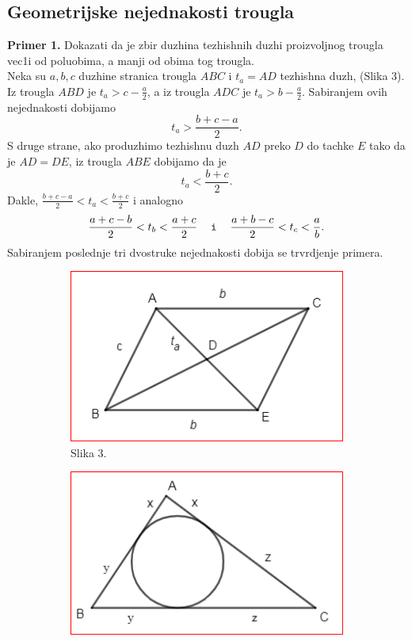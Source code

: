\documentclass[11pt]{article}
\newcommand{\D}{\displaystyle}
\begin{document}
\begin{large}
\begin{flushleft}
\vspace*{-1.3in}
\section*{\centering \huge \textbf{Geometrijske nejednakosti trougla}}
\textbf{Primer 1.} Dokazati da je zbir duzhina tezhishnih duzhi proizvoljnog trougla vec1i od poluobima, a manji od obima tog trougla.\\

\vspace{0.2in}
Neka su $a, b, c$ duzhine stranica trougla $ABC$ i $t_a=AD$ tezhishna duzh, (Slika 3). Iz trougla $ABD$ je $\D t_a>c-\frac{a}{2}$, a iz trougla $ADC$ je $\D t_a>b-\frac{a}{2}$. Sabiranjem ovih nejednakosti dobijamo $$t_a>\frac{b+c-a}{2}.$$S druge strane, ako produzhimo tezhishnu duzh $AD$ preko $D$ do tachke $E$ tako da je $AD=DE$, iz trougla $ABE$ dobijamo da je $$t_a<\frac{b+c}{2}.$$
Dakle, $\D\frac{b+c-a}{2}<t_a<\frac{b+c}{2}$ i analogno\\
$$\D\frac{a+c-b}{2}<t_b<\frac{a+c}{2} \texttt{ \, i \,  } \D\frac{a+b-c}{2}<t_c<\frac{a}{b}.$$
Sabiranjem poslednje tri dvostruke nejednakosti dobija se trvrdjenje primera.
\vspace{0.5cm}
\begin{figure}[h!]
\begin{subfigure}{0.35\textwidth}
\includegraphics[width=\linewidth]{Slike/Slika3}
\caption*{Slika 3.} 
\end{subfigure}
\hspace*{\fill}
\begin{subfigure}{0.35\textwidth}
\includegraphics[width=\linewidth]{Slike/Slika4}

\end{subfigure}
\end{figure}
\end{flushleft}
\end{large}
\end{document}
